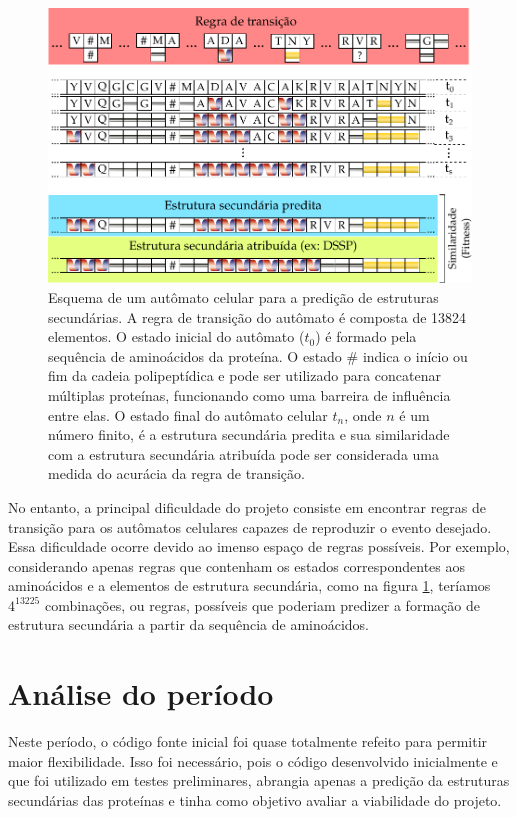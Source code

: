 \begin{figure}[h]
	\includegraphics[width=1\linewidth]{ca-ss_final}
	\caption{Esquema de um autômato celular para a predição de estruturas secundárias. A regra de transição do autômato é composta de 13824 elementos. O estado inicial do autômato ($t_{0}$) é formado pela sequência de aminoácidos da proteína. O estado $\#$ indica o início ou fim da cadeia polipeptídica e pode ser utilizado para concatenar múltiplas proteínas, funcionando como uma barreira de influência entre elas. O estado final do autômato celular $t_{n}$, onde $n$ é um número finito, é a estrutura secundária predita e sua similaridade com a estrutura secundária atribuída pode ser considerada uma medida do acurácia da regra de transição.}
	\label{fig:ca_ss}
\end{figure}

No entanto, a principal dificuldade do projeto consiste em encontrar regras de transição para os autômatos celulares capazes de reproduzir o evento desejado. Essa dificuldade ocorre devido ao imenso espaço de regras possíveis. Por exemplo, considerando apenas regras que contenham os estados correspondentes aos aminoácidos e a elementos de estrutura secundária, como na figura \ref{fig:ca_ss}, teríamos $4^13225$ combinações, ou regras, possíveis que poderiam predizer a formação de estrutura secundária a partir da sequência de aminoácidos.


\section{Análise do período}
Neste período, o código fonte inicial foi quase totalmente refeito para permitir maior flexibilidade. Isso foi necessário, pois o código desenvolvido inicialmente e que foi utilizado em testes preliminares, abrangia apenas a predição da estruturas secundárias das proteínas e tinha como objetivo avaliar a viabilidade do projeto. 

